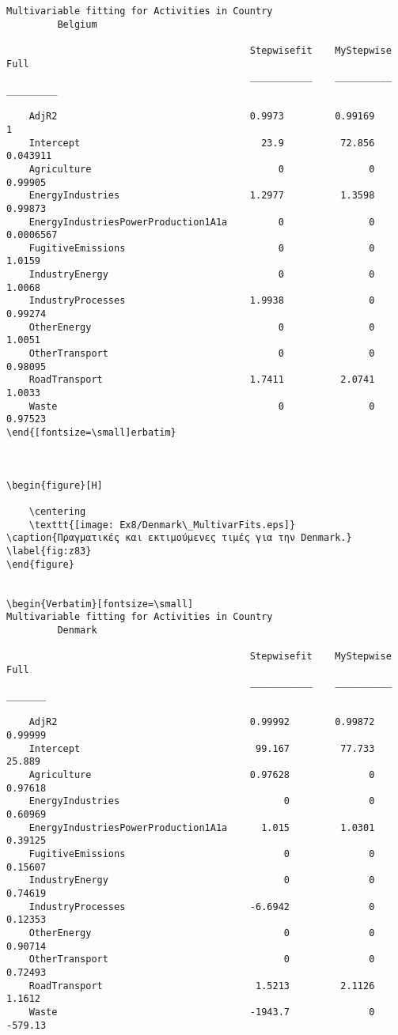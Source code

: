 \documentclass[11pt]{scrartcl} %
\begin{document}
\begin{Verbatim}[fontsize=\small]
Multivariable fitting for Activities in Country
 	 	 Belgium

                                           Stepwisefit    MyStepwise      Full   
                                           ___________    __________    _________

    AdjR2                                  0.9973         0.99169               1
    Intercept                                23.9          72.856        0.043911
    Agriculture                                 0               0         0.99905
    EnergyIndustries                       1.2977          1.3598         0.99873
    EnergyIndustriesPowerProduction1A1a         0               0       0.0006567
    FugitiveEmissions                           0               0          1.0159
    IndustryEnergy                              0               0          1.0068
    IndustryProcesses                      1.9938               0         0.99274
    OtherEnergy                                 0               0          1.0051
    OtherTransport                              0               0         0.98095
    RoadTransport                          1.7411          2.0741          1.0033
    Waste                                       0               0         0.97523
\end{[fontsize=\small]erbatim}



\begin{figure}[H]

	\centering
	\texttt{[image: Ex8/Denmark\_MultivarFits.eps]}	
\caption{Πραγματικές και εκτιμούμενες τιμές για την Denmark.}
\label{fig:z83} 
\end{figure}


\begin{Verbatim}[fontsize=\small]
Multivariable fitting for Activities in Country
 	 	 Denmark

                                           Stepwisefit    MyStepwise     Full  
                                           ___________    __________    _______

    AdjR2                                  0.99992        0.99872       0.99999
    Intercept                               99.167         77.733        25.889
    Agriculture                            0.97628              0       0.97618
    EnergyIndustries                             0              0       0.60969
    EnergyIndustriesPowerProduction1A1a      1.015         1.0301       0.39125
    FugitiveEmissions                            0              0       0.15607
    IndustryEnergy                               0              0       0.74619
    IndustryProcesses                      -6.6942              0       0.12353
    OtherEnergy                                  0              0       0.90714
    OtherTransport                               0              0       0.72493
    RoadTransport                           1.5213         2.1126        1.1612
    Waste                                  -1943.7              0       -579.13
\end{Verbatim}
\end{document}
